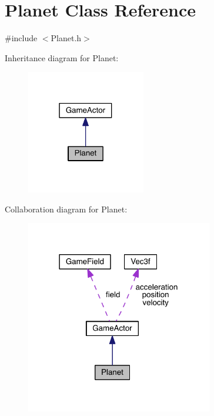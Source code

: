 \hypertarget{class_planet}{\section{Planet Class Reference}
\label{class_planet}
}


{\ttfamily \#include $<$Planet.\+h$>$}



Inheritance diagram for Planet\+:\nopagebreak
\begin{figure}[H]
\begin{center}
\leavevmode
\includegraphics[width=147pt]{class_planet__inherit__graph}
\end{center}
\end{figure}


Collaboration diagram for Planet\+:\nopagebreak
\begin{figure}[H]
\begin{center}
\leavevmode
\includegraphics[width=231pt]{class_planet__coll__graph}
\end{center}
\end{figure}
